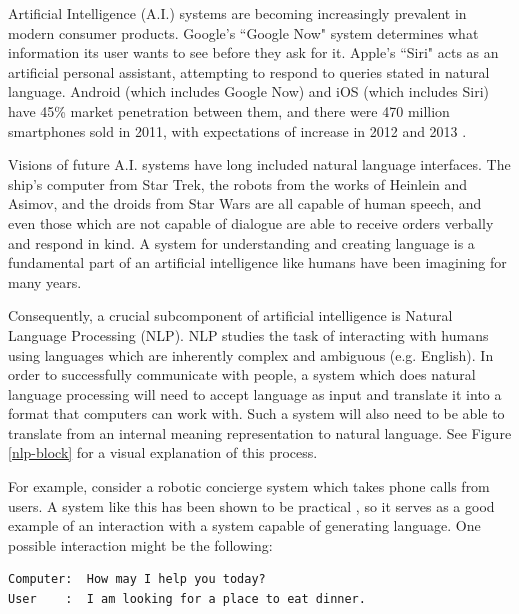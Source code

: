 Artificial Intelligence (A.I.) systems are becoming increasingly prevalent in
modern consumer products.  Google's ``Google Now" system determines
what information its user wants to see before they ask for it.  Apple's ``Siri"
acts as an artificial personal assistant, attempting to respond to queries stated in
natural language.  Android (which includes Google Now) and iOS (which
includes Siri) have 45\% market penetration between them, and there were
470 million smartphones sold in 2011, with expectations of increase in 2012 and 2013
 \cite{smartphones}.

Visions of future A.I. systems have long included natural
language interfaces.  The ship's computer from Star Trek, the robots from
the works of Heinlein and Asimov, and the droids from Star Wars are
all capable of human speech, and even those which are not capable of dialogue
are able to receive orders verbally and respond in kind.  A system 
for understanding and creating language is a fundamental part of
an artificial intelligence like humans have been imagining for many years.

Consequently, a crucial subcomponent of artificial intelligence is Natural Language Processing (NLP).
NLP studies the task of interacting with humans using languages which are inherently
complex and ambiguous (e.g. English).
In order to successfully communicate with people, a system which does natural
language processing will need to accept language as input
and translate it into a format that computers can work with.  Such a system will also
need to be able to translate from an internal meaning representation to natural language.
See Figure \ref{nlp-block} for a visual explanation of this process.

For example, consider a robotic concierge system which takes phone calls from users.
A system like this has been shown to be practical \cite{litman_njfun_2000}, so it serves
as a good example of an interaction with a system capable of generating language.
One possible interaction might be the following:

\begin{verbatim}
Computer:  How may I help you today?
User    :  I am looking for a place to eat dinner.
\end{verbatim}

